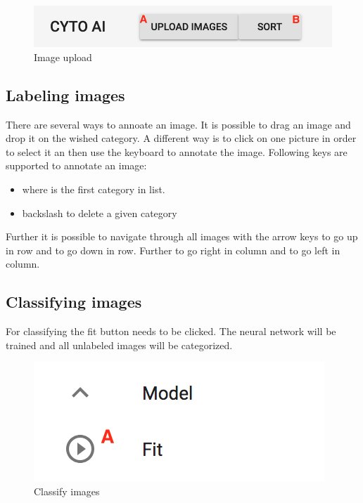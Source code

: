 \begin{figure}[H]
	\centering
	\includegraphics[scale=0.8]{bilder/cyto/UploadImages.png}
	\caption{Image upload}
	\label{fig:ImageUpload}
\end{figure}


\subsection{Labeling images}

There are several ways to annoate an image. It is possible
to drag an image and drop it on the wished category.
A different way is to click on one picture in order to
select it an then use the keyboard to annotate the image.
Following keys are supported to annotate an image:


\begin{itemize}
	\item {}      
	   where  is the first category in list.
	\item \keystroke{$\Leftarrow$} backslash to delete a given category
\end{itemize}

Further it is possible to navigate through all images with the arrow keys \keystroke{$\Uparrow$} to go up in row and 
\keystroke{$\Downarrow$} to go down in row. Further \keystroke{$\Rightarrow$} to go right in column and \keystroke{$\Leftarrow$} to go left in column.


\subsection{Classifying images}

For classifying the fit button needs to be clicked.
The neural network will be trained and all unlabeled
images will be categorized.

\begin{figure}[H]
	\centering
	\includegraphics[scale=0.8]{bilder/cyto/Fit.png}
	\caption{Classify images}
	\label{fig:Clssify}
\end{figure}

